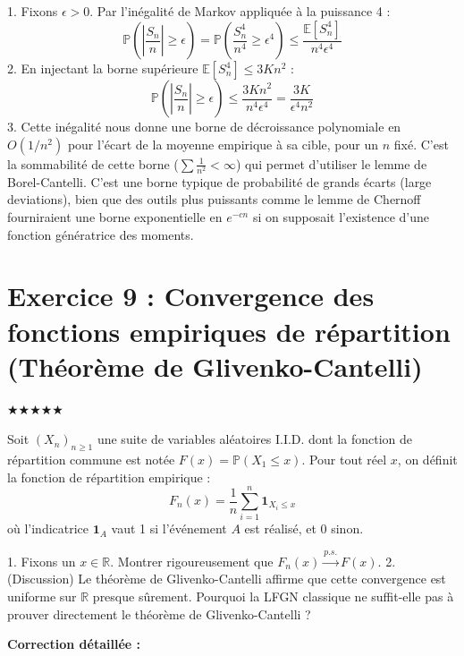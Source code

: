 \documentclass[11pt,a4paper]{article}
\begin{document}
1. Fixons $\epsilon > 0$. Par l'inégalité de Markov appliquée à la puissance 4 :
   $$ \mathbb{P}\left(\left|\frac{S_n}{n}\right| \geq \epsilon\right) = \mathbb{P}\left(\frac{S_n^4}{n^4} \geq \epsilon^4\right) \leq \frac{\mathbb{E}[S_n^4]}{n^4 \epsilon^4} $$
2. En injectant la borne supérieure $\mathbb{E}[S_n^4] \leq 3K n^2$ :
   $$ \mathbb{P}\left(\left|\frac{S_n}{n}\right| \geq \epsilon\right) \leq \frac{3K n^2}{n^4 \epsilon^4} = \frac{3K}{\epsilon^4 n^2} $$
3. Cette inégalité nous donne une borne de décroissance polynomiale en $O(1/n^2)$ pour l'écart de la moyenne empirique à sa cible, pour un $n$ fixé.
   C'est la sommabilité de cette borne ($\sum \frac{1}{n^2} < \infty$) qui permet d'utiliser le lemme de Borel-Cantelli.
   C'est une borne typique de probabilité de grands écarts (large deviations), bien que des outils plus puissants comme le lemme de Chernoff fourniraient une borne exponentielle en $e^{-cn}$ si on supposait l'existence d'une fonction génératrice des moments.


\section*{Exercice 9 : Convergence des fonctions empiriques de répartition (Théorème de Glivenko-Cantelli)}

$\bigstar\bigstar\bigstar\bigstar\bigstar$

Soit $(X_n)_{n \geq 1}$ une suite de variables aléatoires I.I.D. dont la fonction de répartition commune est notée $F(x) = \mathbb{P}(X_1 \leq x)$.
Pour tout réel $x$, on définit la fonction de répartition empirique :
$$ F_n(x) = \frac{1}{n} \sum_{i=1}^n \mathbf{1}_{X_i \leq x} $$
où l'indicatrice $\mathbf{1}_{A}$ vaut 1 si l'événement $A$ est réalisé, et 0 sinon.

1. Fixons un $x \in \mathbb{R}$. Montrer rigoureusement que $F_n(x) \xrightarrow{p.s.} F(x)$.
2. (Discussion) Le théorème de Glivenko-Cantelli affirme que cette convergence est uniforme sur $\mathbb{R}$ presque sûrement. Pourquoi la LFGN classique ne suffit-elle pas à prouver directement le théorème de Glivenko-Cantelli ?

\textbf{Correction détaillée :}
\end{document}
